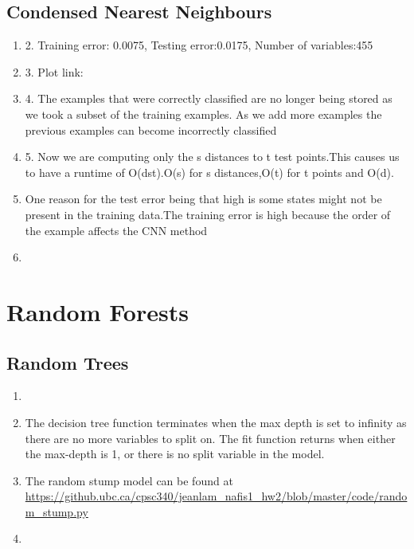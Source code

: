 \documentclass{article}
\begin{document}
\subsection{Condensed Nearest Neighbours}
\begin{enumerate}
\item 2. Training error: 0.0075, Testing error:0.0175, Number of variables:455
\item 3. Plot link:
\item 4. The examples that were correctly classified are no longer being stored as we took a subset of the training examples. As we add more examples the previous examples can become incorrectly classified
\item 5. Now we are computing only the s distances to t test points.This causes us to have a runtime of O(dst).O(s) for s distances,O(t) for t points and O(d).
\item One reason for the test error being that high is some states might not be present in the training data.The training error is high because the order of the example affects the CNN method
\item
\end{enumerate}

\section{Random Forests}
\subsection{Random Trees}
\begin{enumerate}
\item {}
\item The decision tree function terminates when the max depth is set to infinity as there are no more variables to split on. The fit function returns when either the max-depth is 1, or there is no split variable in the model.
\item {} The random stump model can be found at \url{https://github.ubc.ca/cpsc340/jeanlam_nafis1_hw2/blob/master/code/random_stump.py}
\item {}
\end{enumerate}
\end{document}
